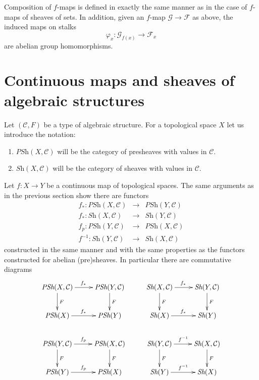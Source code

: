 \medskip\noindent
Composition of $f$-maps is defined in exactly the
same manner as in the case of $f$-maps of sheaves of
sets. In addition, given an $f$-map $\mathcal{G} \to \mathcal{F}$
as above, the induced maps on stalks
$$
\varphi_x : \mathcal{G}_{f(x)} \longrightarrow \mathcal{F}_x
$$
are abelian group homomorphisms.


\section{Continuous maps and sheaves of algebraic structures}
\label{section-presheaves-structures-functorial}

\noindent
Let $(\mathcal{C}, F)$ be a type of algebraic structure.
For a topological space $X$ let us introduce the notation:
\begin{enumerate}
\item $\textit{PSh}(X, \mathcal{C})$ will be the category
of presheaves with values in $\mathcal{C}$.
\item $\textit{Sh}(X, \mathcal{C})$ will be the category
of sheaves with values in $\mathcal{C}$.
\end{enumerate}
Let $f : X \to Y$ be a continuous map of topological spaces.
The same arguments as in the previous section show
there are functors
\begin{eqnarray*}
f_* : \textit{PSh}(X, \mathcal{C}) &
\longrightarrow &
\textit{PSh}(Y, \mathcal{C}) \\
f_* : \textit{Sh}(X, \mathcal{C}) &
\longrightarrow &
\textit{Sh}(Y, \mathcal{C}) \\
f_p : \textit{PSh}(Y, \mathcal{C}) &
\longrightarrow &
\textit{PSh}(X, \mathcal{C}) \\
f^{-1} : \textit{Sh}(Y, \mathcal{C}) &
\longrightarrow &
\textit{Sh}(X, \mathcal{C})
\end{eqnarray*}
constructed in the same manner and with the same
properties as the functors constructed for abelian
(pre)sheaves. In particular there are commutative diagrams
$$
\xymatrix{
\textit{PSh}(X, \mathcal{C}) \ar[r]^{f_*} \ar[d]^F &
\textit{PSh}(Y, \mathcal{C}) \ar[d]^F &
\textit{Sh}(X, \mathcal{C}) \ar[r]^{f_*} \ar[d]^F &
\textit{Sh}(Y, \mathcal{C}) \ar[d]^F
\\
\textit{PSh}(X) \ar[r]^{f_*} &
\textit{PSh}(Y) &
\textit{Sh}(X) \ar[r]^{f_*} &
\textit{Sh}(Y)
\\
\textit{PSh}(Y, \mathcal{C}) \ar[r]^{f_p} \ar[d]^F &
\textit{PSh}(X, \mathcal{C}) \ar[d]^F &
\textit{Sh}(Y, \mathcal{C}) \ar[r]^{f^{-1}} \ar[d]^F &
\textit{Sh}(X, \mathcal{C}) \ar[d]^F
\\
\textit{PSh}(Y) \ar[r]^{f_p} &
\textit{PSh}(X) &
\textit{Sh}(Y) \ar[r]^{f^{-1}} &
\textit{Sh}(X)
}
$$

